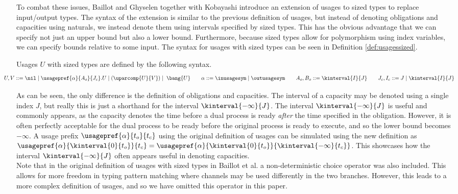 To combat these issues, Baillot and Ghyselen together with Kobayashi introduce an extension of usages to sized types \cite{BaillotEtAl2021} to replace input/output types. The syntax of the extension is similar to the previous definition of usages, but instead of denoting obligations and capacities using naturals, we instead denote them using intervals specified by sized types. This has the obvious advantage that we can specify not just an upper bound but also a lower bound. Furthermore, because sized types allow for polymorphism using index variables, we can specify bounds relative to some input. The syntax for usages with sized types can be seen in Definition \ref{def:usagessized}.
%
\begin{defi}
Usages $U$ with sized types are defined by the following syntax.
%
\begin{align*}
    \kern-2.5em U,V ::= \nil \mid \usagepref{\alpha}{A_o}{J_c}.U \mid (\uparcomp{U}{V}) \mid \;\bang{U} \quad\quad \alpha ::= \inusagesym \mid \outusagesym\quad\quad A_o, B_o ::= \kinterval{I}{J} \quad \quad J_c, I_c ::= J \mid \kinterval{I}{J}
\end{align*}
\label{def:usagessized}
\end{defi}
%
As can be seen, the only difference is the definition of obligations and capacities. The interval of a capacity may be denoted using a single index $J$, but really this is just a shorthand for the interval $\kinterval{-\infty}{J}$. The interval $\kinterval{-\infty}{J}$ is useful and commonly appears, as the capacity denotes the time before a dual process is ready \textit{after} the time specified in the obligation. However, it is often perfectly acceptable for the dual process to be ready before the original process is ready to execute, and so the lower bound becomes $-\infty$. A usage prefix $\usagepref{\alpha}{t_o}{t_c}$ using the original definition of usages can be simulated using the new definition as $\usagepref{\alpha}{\kinterval{0}{t_o}}{t_c} = \usagepref{\alpha}{\kinterval{0}{t_o}}{\kinterval{-\infty}{t_c}}$. This showcases how the interval $\kinterval{-\infty}{J}$ often appears useful in denoting capacities.\\

Note that in the original definition of usages with sized types in Baillot et al. a non-deterministic choice operator was also included. This allows for more freedom in typing pattern matching where channels may be used differently in the two branches. However, this leads to a more complex definition of usages, and so we have omitted this operator in this paper.\\


